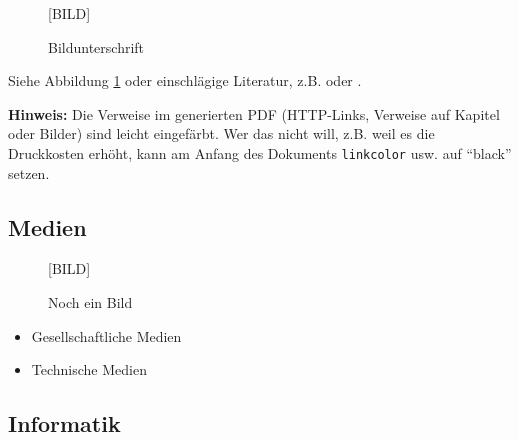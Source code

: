 \documentclass[11pt,a4paper,twoside]{article}
\begin{document}
\begin{figure}%


  \begin{center}\LARGE [BILD]\end{center}
  \caption{Bildunterschrift}
  \label{fig:beispielbild}
\end{figure}


Siehe Abbildung \ref{fig:beispielbild} oder einschlägige Literatur, z.B.
\cite[Seite 6]{Brill1992ATagger} oder \cite{Porter1980AnStripping}.

\bigskip %
\textbf{Hinweis:} Die Verweise im generierten PDF (HTTP-Links, Verweise auf Kapitel oder Bilder) sind leicht eingefärbt. Wer das nicht will, z.B. weil es die Druckkosten erhöht, kann am Anfang des Dokuments \texttt{linkcolor} usw. auf ``black'' setzen.


\subsection{Medien}

\begin{figure}
  \begin{center}\LARGE [BILD]\end{center}
  \caption{Noch ein Bild}
  \label{fig:beispielbild2}
\end{figure}

\begin{itemize}
  \item Gesellschaftliche Medien
  \item Technische Medien
\end{itemize}


\subsection{Informatik}
\end{document}
